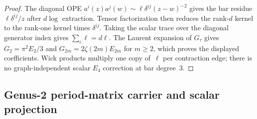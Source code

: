 \begin{proof}
The diagonal OPE
$a^i(z)a^j(w)\sim\ell\delta^{ij}(z-w)^{-2}$ gives the bar residue
$\ell\delta^{ij}/z$ after $d\log$ extraction. Tensor factorization
then reduces the rank-$d$ kernel to the rank-one kernel times
$\delta^{ij}$. Taking the scalar trace over the diagonal generator
index gives $\sum_i\ell=d\ell$. The Laurent expansion of
$G_\tau$ gives $G_2=\pi^2E_2/3$ and
$G_{2m}=2\zeta(2m)E_{2m}$ for $m\ge2$, which proves the displayed
coefficients. Wick products multiply one copy of~$\ell$ per
contraction edge; there is no graph-independent scalar
$E_4$ correction at bar degree~$3$.
\end{proof}


\subsection{Genus-2 period-matrix carrier and scalar projection}

